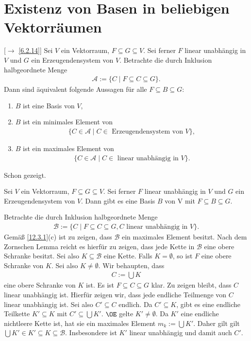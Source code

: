 \documentclass[../../main.tex]{subfiles}
\begin{document}
\section{Existenz von Basen in beliebigen Vektorräumen}
\begin{sat}\label{12.3.1}
[$\to$ \ref{6.2.14}] Sei $V$ ein Vektorraum, $F\subseteq G\subseteq V$. Sei ferner $F$ linear unabhängig in $V$ und $G$ ein Erzeugendensystem von $V$. Betrachte die durch Inklusion halbgeordnete Menge
\begin{align*}
\mathcal{A}:=\{C\mid F\subseteq C\subseteq G\}.
\end{align*}
Dann sind äquivalent folgende Aussagen für alle $F\subseteq B\subseteq G$:
\begin{enumerate}[\normalfont (a)]
\item $B$ ist eine Basis von $V$,
\item $B$ ist ein minimales Element von
\begin{align*}
\{C\in \mathcal{A}\mid C\in\text{ Erzeugendensystem von } V\},
\end{align*}
\item $B$ ist ein maximales Element von
\begin{align*}
\{C\in \mathcal{A}\mid C\in\text{ linear unabhängig in } V\}.
\end{align*}
\end{enumerate}
\end{sat}
\begin{cproof}
Schon gezeigt.
\end{cproof}

\begin{kor}\label{12.3.2}
Sei $V$ ein Vektorraum, $F\subseteq G\subseteq V$. Sei ferner $F$ linear unabhängig in $V$ und $G$ ein Erzeugendensystem von $V$. Dann gibt es eine Basis $B$ von V mit $F\subseteq B\subseteq G$.
\end{kor}
\begin{cproof}
Betrachte die durch Inklusion halbgeordnete Menge
\begin{align*}
\mathcal{B}:=\{C\mid F\subseteq C\subseteq G, C\text{ linear unabhängig in }V\}.
\end{align*}
Gemäß \ref{12.3.1}(c) ist zu zeigen, dass $\mathcal{B}$ ein maximales Element besitzt. Nach dem Zornschen Lemma reicht es hierfür zu zeigen, dass jede Kette in $\mathcal{B}$ eine obere Schranke besitzt. Sei also $K\subseteq \mathcal{B}$ eine Kette. Falls $K=\emptyset$, so ist $F$ eine obere Schranke von $K$. Sei also $K\neq \emptyset$. Wir behaupten, dass
\begin{align*}
C:=\bigcup K
\end{align*}
eine obere Schranke von $K$ ist. Es ist $F\subseteq C\subseteq G$ klar. Zu zeigen bleibt, dass $C$ linear unabhängig ist. Hierfür zeigen wir, dass jede endliche Teilmenge von $C$ linear unabhängig ist. Sei also $C'\subseteq C$ endlich. Da $C'\subseteq K$, gibt es eine endliche Teilkette $K'\subseteq K$ mit $C'\subseteq \bigcup K'$. $\OE$ gelte $K'\neq \emptyset$. Da $K'$ eine endliche nichtleere Kette ist, hat sie ein maximales Element $m_k:=\bigcup K'$. Daher gilt gilt $\bigcup K'\in K'\subseteq K\subseteq \mathcal{B}$. Insbesondere ist $K'$ linear unabhängig und damit auch $C'$.
\end{cproof}
\end{document}
